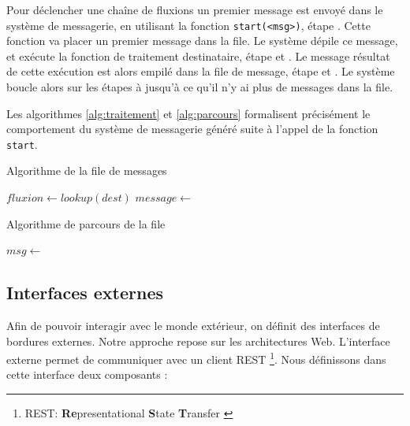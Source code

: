 Pour déclencher une chaîne de fluxions un premier message est envoyé dans le système de messagerie, en utilisant la fonction \texttt{start(<msg>)}, étape .
Cette fonction va placer un premier message dans la file.
Le système dépile ce message, et exécute la fonction de traitement destinataire, étape  et .
Le message résultat de cette exécution est alors empilé dans la file de message, étape  et .
Le système boucle alors sur les étapes  à  jusqu'à ce qu'il n'y ai plus de messages dans la file.

Les algorithmes \ref{alg:traitement} et \ref{alg:parcours} formalisent précisément le comportement du système de messagerie généré suite à l'appel de la fonction \texttt{start}.

\begin{algorithm}
\caption{Algorithme de la file de messages}
\label{alg:traitement}
\begin{algorithmic}
\State $fluxion \gets lookup(dest)$
\State $message \gets$  
\State {} 
\EndFor
\EndFunction
\end{algorithmic}
\end{algorithm}

\begin{algorithm}
\caption{Algorithme de parcours de la file}
\label{alg:parcours}
\begin{algorithmic}
\State $msg \gets$  
\State {}
\EndWhile
\EndFunction
\end{algorithmic}
\end{algorithm}

\subsection{Interfaces externes}

Afin de pouvoir interagir avec le monde extérieur, on définit des interfaces de bordures externes.
Notre approche repose sur les architectures Web.
L'interface externe permet de communiquer avec un client REST \footnote{REST: \textbf{Re}presentational \textbf{S}tate \textbf{T}ransfer \cite{Fielding2002}}.
Nous définissons dans cette interface deux composants :

